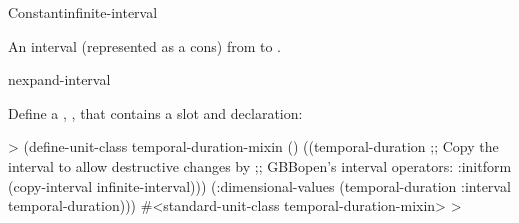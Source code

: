 \documentclass[10pt,twoside,english,pdftex]{article}
\begin{document}
\begin{functiondoc}{Constant}{infinite-interval}{}%

\fnsyntax

\fnpurpose An interval (represented as a cons) from  to
.

\fnpackage {}

\fnmodule {}

\begin{alsos}{nexpand-interval}
\end{alsos}

\fnexample
%
%
%
%
Define a , , that
contains a  slot and 
declaration:
%
\W\supp
\begin{example}
  > (define-unit-class temporal-duration-mixin ()
      ((temporal-duration 
         ;; Copy the interval to allow destructive changes by
         ;; GBBopen's interval operators:
         :initform (copy-interval infinite-interval)))
      (:dimensional-values
       (temporal-duration :interval temporal-duration)))
  #<standard-unit-class temporal-duration-mixin>
  >
\end{example}

\end{functiondoc}

\end{document}
